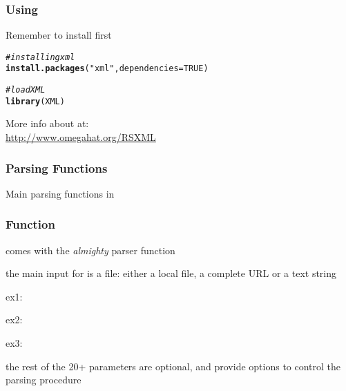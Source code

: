 \documentclass[12pt]{beamer}\usepackage[]{graphicx}\usepackage[]{color}
\makeatletter
\newcommand{\hlnum}[1]{\textcolor[rgb]{0.686,0.059,0.569}{#1}}%
\newcommand{\hlstr}[1]{\textcolor[rgb]{0.192,0.494,0.8}{#1}}%
\newcommand{\hlcom}[1]{\textcolor[rgb]{0.678,0.584,0.686}{\textit{#1}}}%
\newcommand{\hlstd}[1]{\textcolor[rgb]{0.345,0.345,0.345}{#1}}%
\newcommand{\hlkwc}[1]{\textcolor[rgb]{0.333,0.667,0.333}{#1}}%
\newcommand{\hlkwd}[1]{\textcolor[rgb]{0.737,0.353,0.396}{\textbf{#1}}}%
\newenvironment{kframe}{%
 \def\at@end@of@kframe{}%
 \ifinner\ifhmode%
  \def\at@end@of@kframe{\end{minipage}}%
  \begin{minipage}{\columnwidth}%
 \fi\fi%
 \def\FrameCommand##1{\hskip\@totalleftmargin \hskip-\fboxsep
 \colorbox{shadecolor}{##1}\hskip-\fboxsep
     \hskip-\linewidth \hskip-\@totalleftmargin \hskip\columnwidth}%
 \MakeFramed {\advance\hsize-\width
   \@totalleftmargin\z@ \linewidth\hsize
   \@setminipage}}%
 {\par\unskip\endMakeFramed%
 \at@end@of@kframe}
\newenvironment{knitrout}{}{} %
\makeatother
\begin{document}
\begin{frame}[fragile]
\frametitle{Using }

Remember to install  first
\begin{knitrout}\footnotesize
{}\color{fgcolor}\begin{kframe}
\begin{alltt}
\hlcom{# installing xml}
\hlkwd{install.packages}\hlstd{(}\hlstr{"xml"}\hlstd{,} \hlkwc{dependencies} \hlstd{=} \hlnum{TRUE}\hlstd{)}

\hlcom{# load XML}
\hlkwd{library}\hlstd{(XML)}
\end{alltt}
\end{kframe}
\end{knitrout}



More info about  at: \\
{\scriptsize \url{http://www.omegahat.org/RSXML}}

\end{frame}


\begin{frame}
\begin{center}
\Huge{}
\end{center}
\end{frame}


\begin{frame}
\frametitle{Parsing Functions}

Main parsing functions in 
\bbi
 \item {}
 \item {}
 \item {}
 \item {}
\ei

\end{frame}


\begin{frame}
\frametitle{Function }

\bi
\item {} comes with the \textit{almighty} parser function {\hilit {}}
 \item the main input for {\hilit {}} is a file: either a local file, a complete URL or a text string
 \bi
 \item[ex1:] 
 \item[ex2:] 
 \item[ex3:] 
 \ei
 \item the rest of the 20+ parameters are optional, and provide options to control the parsing procedure
\ei
\eb

\end{frame}
\end{document}
